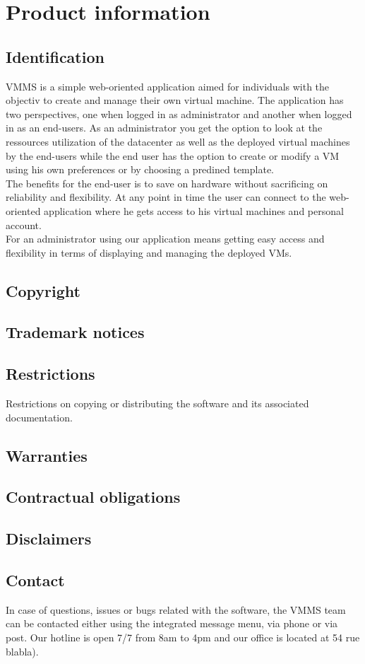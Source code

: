 \chapter{Product information}
\vspace{-6em}


\section{Identification}
VMMS is a simple web-oriented application aimed for individuals with the
objectiv to create and manage their own virtual machine. The application    
has two perspectives, one when logged in as administrator and another when
logged in as an end-users. As an administrator you get the option to look at
the ressources utilization of the datacenter as well as the deployed virtual
machines by the end-users while the end user has the option to create or modify 
a VM using his own preferences or by choosing a predined template.\\The benefits
for the end-user is to save on hardware without sacrificing on reliability and 
flexibility. At any point in time the user can connect to the web-oriented
application where he gets access to his virtual machines and personal
account.\\For an administrator using our application means getting easy access 
and flexibility in terms of displaying and managing the deployed VMs.

\section{Copyright}

\section{Trademark notices}

\section{Restrictions}
Restrictions on copying or distributing the software and its associated
documentation.

\section{Warranties}

\section{Contractual obligations}

\section{Disclaimers}

\section{Contact}
In case of questions, issues or bugs related with the software, the VMMS team
can be contacted either using the integrated message menu, via phone or via
post. Our hotline is open 7/7 from 8am to 4pm and our office is located
at 54 rue blabla).
